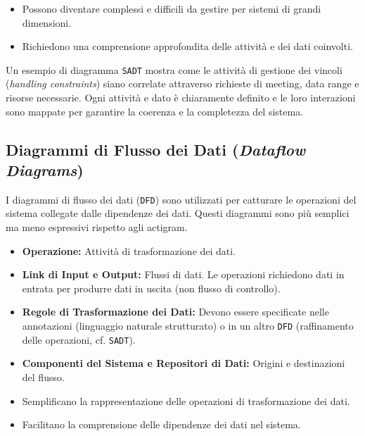 \begin{tcolorbox}[colback=red!5!white,colframe=red!75!black,title=Svantaggi
    dei Diagrammi \texttt{SADT}]
    \begin{itemize}
        \item Possono diventare complessi e difficili da gestire per sistemi di grandi
        dimensioni.
        \item Richiedono una comprensione approfondita delle attività e dei dati coinvolti.
    \end{itemize}
\end{tcolorbox}

Un esempio di diagramma \texttt{SADT} mostra come le attività di gestione dei vincoli
(\textit{handling constraints}) siano correlate attraverso richieste di meeting,
data range e risorse necessarie. Ogni attività e dato è chiaramente definito
e le loro interazioni sono mappate per garantire la coerenza e la completezza
del sistema.

\subsection{Diagrammi di Flusso dei Dati (\textit{Dataflow Diagrams})}
I diagrammi di flusso dei dati (\texttt{DFD}) sono utilizzati per catturare le operazioni
del sistema collegate dalle dipendenze dei dati. Questi diagrammi sono più semplici
ma meno espressivi rispetto agli actigram.

\begin{itemize}
    \item \textbf{Operazione:} Attività di trasformazione dei dati.
    \item \textbf{Link di Input e Output:} Flussi di dati. Le operazioni richiedono
    dati in entrata per produrre dati in uscita (non flusso di controllo).
    \item \textbf{Regole di Trasformazione dei Dati:} Devono essere specificate nelle
    annotazioni (linguaggio naturale strutturato) o in un altro \texttt{DFD} 
    (raffinamento delle operazioni,
    cf. \texttt{SADT}).
    \item \textbf{Componenti del Sistema e Repositori di Dati:} Origini e destinazioni
    del flusso.
\end{itemize}

\begin{tcolorbox}[colback=green!5!white,colframe=green!75!black,title=Vantaggi dei
    Diagrammi di Flusso dei Dati]
    \begin{itemize}
        \item Semplificano la rappresentazione delle operazioni di trasformazione dei dati.
        \item Facilitano la comprensione delle dipendenze dei dati nel sistema.
    \end{itemize}
\end{tcolorbox}

